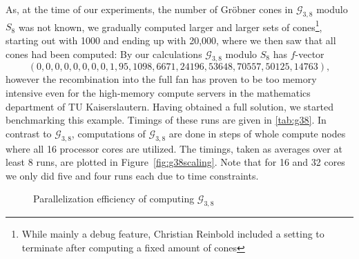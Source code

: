 \documentclass[
  paper=a4,
  titlepage,
  bibliography=totoc,
  pagesize=pdftex
]{scrartcl}
\numberwithin{figure}{section}
\numberwithin{equation}{section}
\numberwithin{table}{section}
\theoremstyle{definition}
\numberwithin{definition}{section}
\begin{document}
As, at the time of our experiments, the number of Gröbner cones in $\mathcal G_{3,8}$
modulo $S_8$ was not known, we gradually computed larger and larger sets of
cones\footnote{While mainly a debug feature, Christian Reinbold included a setting to
terminate after computing a fixed amount of cones}, starting out with 1000 and ending up
with {20,000}, where we then saw that all cones had been computed: By our calculations
$\mathcal G_{3,8}$ modulo $S_8$ has $f$-vector
\[
  (0,0,0,0,0,0,0,0,1,95,1098,6671,24196,53648,70557,50125,14763),
\]
however the recombination into the full fan has proven to be too memory intensive even for
the high-memory compute servers in the mathematics department of TU Kaiserslautern. Having
obtained a full solution, we started benchmarking this example. Timings of these runs are
given in \ref{tab:g38}. In contrast to $\mathcal G_{3,8}$, computations of $\mathcal
G_{3,8}$ are done in steps of whole compute nodes where all 16 processor cores are
utilized. The timings, taken as averages over at least 8 runs, are plotted in
Figure~\ref{fig:g38scaling}. Note that for 16 and 32 cores we only did five and four runs
each due to time constraints.

\begin{figure}[htb]
  \begin{center}
    
  \end{center}
  \caption{Parallelization efficiency of computing $\mathcal{G}_{3,8}$}
  \label{fig:g38efficiency}
\end{figure}
\end{document}
